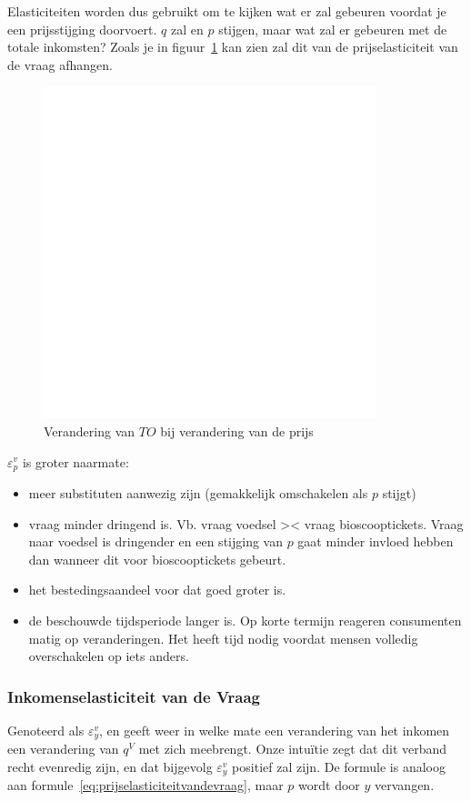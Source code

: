 Elasticiteiten worden dus gebruikt om te kijken wat er zal gebeuren voordat je een prijsstijging doorvoert. $q$ zal en $p$ stijgen, maar wat zal er gebeuren met de totale inkomsten? Zoals je in figuur~\ref{fig:prijsveranderingelasticiteiten} kan zien zal dit van de prijselasticiteit van de vraag afhangen.
\begin{figure}[htbp]
	\centering
	\includegraphics[scale=0.4]{Images/white.png}
	\caption{Verandering van $TO$ bij verandering van de prijs}
	\label{fig:prijsveranderingelasticiteiten}
\end{figure}

$\varepsilon^{v}_{p}$ is groter naarmate:
\begin{itemize}
	\item meer substituten aanwezig zijn (gemakkelijk omschakelen als $p$ stijgt)
    \item vraag minder dringend is. Vb. vraag voedsel >< vraag bioscooptickets. Vraag naar voedsel is dringender en een stijging van $p$ gaat minder invloed hebben dan wanneer dit voor bioscooptickets gebeurt.
    \item het bestedingsaandeel voor dat goed groter is.
    \item de beschouwde tijdsperiode langer is. Op korte termijn reageren consumenten matig op veranderingen. Het heeft tijd nodig voordat mensen volledig overschakelen op iets anders.
\end{itemize}



\subsubsection{Inkomenselasticiteit van de Vraag}
Genoteerd als $\varepsilon^{v}_{y}$, en geeft weer in welke mate een verandering van het inkomen een verandering van $q^V$ met zich meebrengt. Onze intu\"itie zegt dat dit verband recht evenredig zijn, en dat bijgevolg $\varepsilon^{v}_{y}$ positief zal zijn. De formule is analoog aan formule~\ref{eq:prijselasticiteitvandevraag}, maar $p$ wordt door $y$ vervangen.

